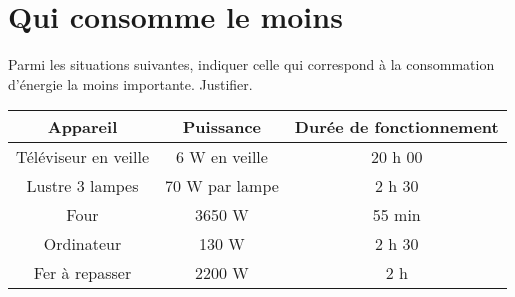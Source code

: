 \section{Qui consomme le moins}

\begin{questions}
	\question Parmi les situations suivantes, indiquer celle qui correspond à la consommation d'énergie la moins importante. Justifier.
	
	\begin{center}
		\begin{tabular}{|@{\ }c@{\ }|@{\ }c@{\ }|@{\ }c@{\ }|}
		\hline
		\textbf{Appareil}    & \textbf{Puissance} & \textbf{Durée de fonctionnement} \\ \hline
		Téléviseur en veille &  6 W en veille     & 20 h 00                          \\ \hline
		Lustre 3 lampes      &  70 W par lampe	  & 2 h 30                           \\ \hline
		Four                 &  \num{3650} W      & 55 min                           \\ \hline
		Ordinateur           &  130 W             & 2 h 30                         \\ \hline
		Fer à repasser       &  \num{2200} W      & 2 h                              \\ \hline
	\end{tabular}
	\end{center}

	\fillwithdottedlines{5cm}
\end{questions}